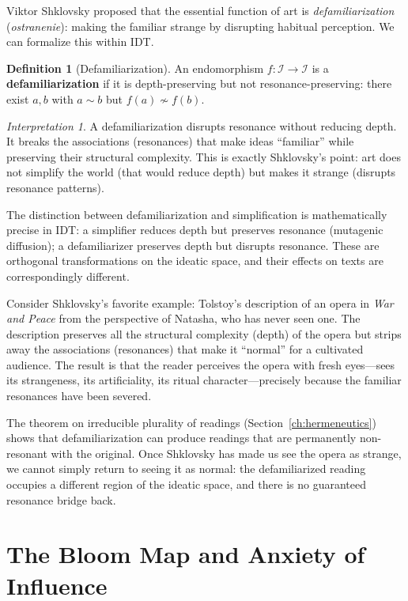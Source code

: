 \documentclass[11pt,openany]{book}
\theoremstyle{definition}
\newtheorem{definition}[axiom]{Definition}
\theoremstyle{plain}
\theoremstyle{remark}
\newtheorem{interpretation}[axiom]{Interpretation}
\newcommand{\IS}{\mathcal{I}}               %
\newcommand{\res}{\sim}                      %
\begin{document}
Viktor Shklovsky proposed that the essential function of art is \emph{defamiliarization} (\textit{ostranenie}): making the familiar strange by disrupting habitual perception. We can formalize this within IDT.

\begin{definition}[Defamiliarization]
An endomorphism $f : \IS \to \IS$ is a \textbf{defamiliarization} if it is depth-preserving but not resonance-preserving: there exist $a, b$ with $a \res b$ but $f(a) \not\res f(b)$.
\end{definition}

\begin{interpretation}
A defamiliarization disrupts resonance without reducing depth. It breaks the associations (resonances) that make ideas ``familiar'' while preserving their structural complexity. This is exactly Shklovsky's point: art does not simplify the world (that would reduce depth) but makes it strange (disrupts resonance patterns).

The distinction between defamiliarization and simplification is mathematically precise in IDT: a simplifier reduces depth but preserves resonance (mutagenic diffusion); a defamiliarizer preserves depth but disrupts resonance. These are orthogonal transformations on the ideatic space, and their effects on texts are correspondingly different.

Consider Shklovsky's favorite example: Tolstoy's description of an opera in \textit{War and Peace} from the perspective of Natasha, who has never seen one. The description preserves all the structural complexity (depth) of the opera but strips away the associations (resonances) that make it ``normal'' for a cultivated audience. The result is that the reader perceives the opera with fresh eyes---sees its strangeness, its artificiality, its ritual character---precisely because the familiar resonances have been severed.

The theorem on irreducible plurality of readings (Section~\ref{ch:hermeneutics}) shows that defamiliarization can produce readings that are permanently non-resonant with the original. Once Shklovsky has made us see the opera as strange, we cannot simply return to seeing it as normal: the defamiliarized reading occupies a different region of the ideatic space, and there is no guaranteed resonance bridge back.
\end{interpretation}

\section{The Bloom Map and Anxiety of Influence}
\end{document}
